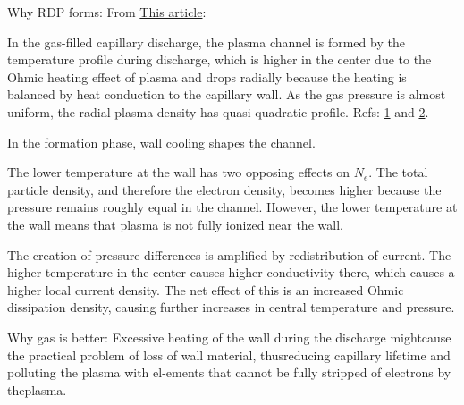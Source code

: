 \documentclass[../main.tex]{subfiles}
\begin{document}
Why RDP forms:
From \href{https://aip.scitation.org/doi/pdf/10.1063/1.5022817}{This article}:

In the gas-filled capillary discharge, the plasma channel is formed by the temperature profile during discharge, which is higher in the center due to the Ohmic heating effect of plasma and drops radially because the heating is balanced by heat conduction to the capillary wall. As the gas pressure is almost uniform, the radial plasma density has quasi-quadratic profile.
Refs: \href{https://journals.aps.org/pre/pdf/10.1103/PhysRevE.71.016401}{1} and \href{https://journals.aps.org/pre/pdf/10.1103/PhysRevE.65.016407}{2}.

In the formation phase, wall cooling shapes the channel.

The lower temperature at the wall has two opposing effects on $N_e$. The total particle density, and therefore the electron  density,  becomes higher because the pressure  remains roughly equal in the channel. However, the  lower temperature at the wall means that  plasma is not fully ionized near the wall.

The creation of pressure differences is amplified by redistribution of current. The  higher temperature in the center causes higher conductivity there, which causes a higher local current density. The net effect of this is an increased Ohmic dissipation density, causing further increases in central temperature and pressure.

Why gas is better:
Excessive heating of the wall during the discharge mightcause  the  practical  problem  of  loss  of  wall  material,  thusreducing capillary lifetime and polluting the plasma with el-ements  that  cannot  be  fully  stripped  of  electrons  by  theplasma.
\end{document}
